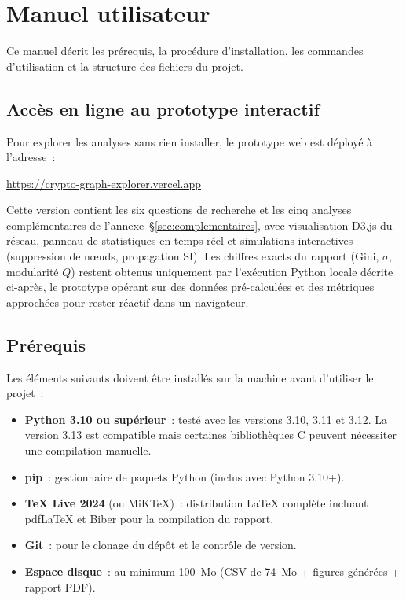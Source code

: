
\section{Manuel utilisateur}
\label{ann:manuel}

Ce manuel d\'ecrit les pr\'erequis, la proc\'edure d'installation, les commandes d'utilisation et la structure des fichiers du projet.


\subsection{Acc\`es en ligne au prototype interactif}

Pour explorer les analyses sans rien installer, le prototype web est d\'eploy\'e \`a l'adresse~:

\begin{center}
\large\url{https://crypto-graph-explorer.vercel.app}
\end{center}

Cette version contient les six questions de recherche et les cinq analyses compl\'ementaires de l'annexe~\S\ref{sec:complementaires}, avec visualisation D3.js du r\'eseau, panneau de statistiques en temps r\'eel et simulations interactives (suppression de n\oe{}uds, propagation SI). Les chiffres exacts du rapport (Gini, $\sigma$, modularit\'e $Q$) restent obtenus uniquement par l'ex\'ecution Python locale d\'ecrite ci-apr\`es, le prototype op\'erant sur des donn\'ees pr\'e-calcul\'ees et des m\'etriques approch\'ees pour rester r\'eactif dans un navigateur.


\subsection{Pr\'erequis}

Les \'el\'ements suivants doivent \^etre install\'es sur la machine avant d'utiliser le projet~:

\begin{itemize}
  \item \textbf{Python 3.10 ou sup\'erieur}~: test\'e avec les versions 3.10, 3.11 et 3.12. La version 3.13 est compatible mais certaines biblioth\`eques C peuvent n\'ecessiter une compilation manuelle.
  \item \textbf{pip}~: gestionnaire de paquets Python (inclus avec Python 3.10+).
  \item \textbf{TeX Live 2024} (ou MiKTeX)~: distribution LaTeX compl\`ete incluant pdfLaTeX et Biber pour la compilation du rapport.
  \item \textbf{Git}~: pour le clonage du d\'ep\^ot et le contr\^ole de version.
  \item \textbf{Espace disque}~: au minimum 100~Mo (CSV de 74~Mo + figures g\'en\'er\'ees + rapport PDF).
\end{itemize}

